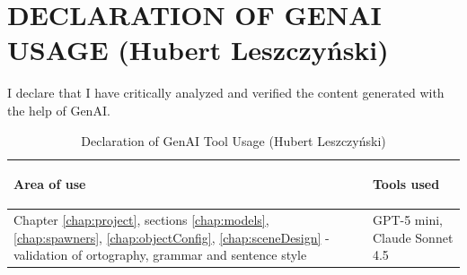\section{DECLARATION OF GENAI USAGE (Hubert Leszczyński)}
\label{chap:genaiHL}


I declare that I have critically analyzed and verified the content generated with the help of GenAI.


\begin{table}[H]
\caption{Declaration of GenAI Tool Usage (Hubert Leszczyński)}
\label{tab:genaiHL}
\begin{center}
\begin{tabular}{|p{}|p{}|}
    \hline
    \begin{center}
       \textbf{Area of use}
   \end{center}
   & \begin{center}
       \textbf{Tools used}
   \end{center}
   \\ \hline
Chapter \ref{chap:project}, sections \ref{chap:models}, \ref{chap:spawners}, \ref{chap:objectConfig}, \ref{chap:sceneDesign} - validation of ortography, grammar and sentence style & GPT-5 mini, Claude Sonnet 4.5 \\
\hline
\end{tabular}
\end{center}
\end{table}


